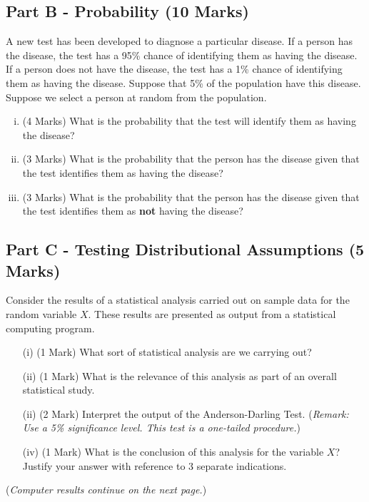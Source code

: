 \documentclass[a4paper,12pt]{article}
\begin{document}
\bigskip
\subsection*{Part B - Probability (10 Marks)} %
A new test has been developed to diagnose a particular disease. If a person has the disease, the test has a 95\% chance of identifying them as having the disease.
If a person does not have the disease, the test has a 1\% chance of identifying them as having the disease.  Suppose that 5\% of the population have this disease. Suppose we select a person at random from the population.


\begin{enumerate}[(i)]
	\item (4 Marks) What is the probability that the test will identify them as having the disease?
	
	\item (3 Marks) What is the probability that the person has the disease given that the test identifies them as having the disease?
	\item (3 Marks) What is the probability that the person has the disease given that the test identifies them as \textbf{not} having the disease?
\end{enumerate}

\subsection*{Part C - Testing Distributional Assumptions (5 Marks)}
Consider the results of a statistical analysis carried out on sample data for the random variable $X$. These results are presented as output from a statistical computing program.

\begin{itemize}
	\item[(i)] (1 Mark) What sort of statistical analysis are we carrying out? 
	\item[(ii)] (1 Mark) What is the relevance of this analysis as part of an overall statistical study.
	\item[(ii)] (2 Mark) Interpret the output of the Anderson-Darling Test. (\textit{Remark: Use a 5\% significance level. This test is a one-tailed procedure.})
	\item[(iv)] (1 Mark) What is the conclusion of this analysis for the variable $X$? Justify your answer with reference to 3 separate indications. 
	
\end{itemize}
\noindent (\textit{Computer results continue on the next page.})
\end{document}

